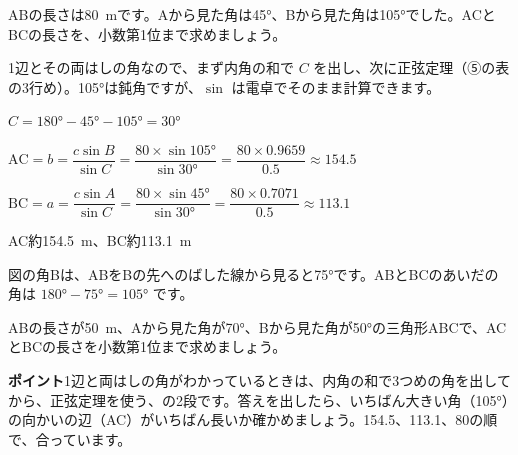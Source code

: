 \begin{reidai}
\noindent\begin{minipage}[t]{0.62\linewidth}
ABの長さは\qty{80}{m}です。Aから見た角は\ang{45}、Bから見た角は\ang{105}でした。ACとBCの長さを、小数第1位まで求めましょう。\par
\kangaekata 1辺とその両はしの角なので、まず内角の和で $C$ を出し、次に正弦定理（⑤の表の3行め）。\ang{105}は鈍角ですが、$\sin$ は電卓でそのまま計算できます。
\end{minipage}\hfill
\begin{minipage}[t]{0.34\linewidth}\vspace{0pt}\centering
{}
\end{minipage}\par
\shiki $C=\ang{180}-\ang{45}-\ang{105}=\ang{30}$\par
\hspace*{2.6\zw}$\mathrm{AC}=b=\dfrac{c\sin B}{\sin C}=\dfrac{80\times\sin\ang{105}}{\sin\ang{30}}=\dfrac{80\times0.9659}{0.5}\approx154.5$\par
\hspace*{2.6\zw}$\mathrm{BC}=a=\dfrac{c\sin A}{\sin C}=\dfrac{80\times\sin\ang{45}}{\sin\ang{30}}=\dfrac{80\times0.7071}{0.5}\approx113.1$\par
\kotae AC約\qty{154.5}{m}、BC約\qty{113.1}{m}
\end{reidai}
図の角Bは、ABをBの先へのばした線から見ると\ang{75}です。ABとBCのあいだの角は $\ang{180}-\ang{75}=\ang{105}$ です。

\begin{jibun}
ABの長さが\qty{50}{m}、Aから見た角が\ang{70}、Bから見た角が\ang{50}の三角形ABCで、ACとBCの長さを小数第1位まで求めましょう。
\end{jibun}
\textbf{ポイント}\quad 1辺と両はしの角がわかっているときは、内角の和で3つめの角を出してから、正弦定理を使う、の2段です。答えを出したら、いちばん大きい角（\ang{105}）の向かいの辺（AC）がいちばん長いか確かめましょう。154.5、113.1、80の順で、合っています。

